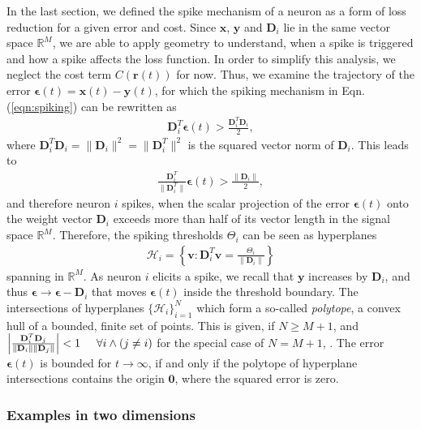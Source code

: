 \documentclass[twoside,twocolumn]{article}
\renewcommand{\b}[1]{\textbf{#1}}
\newcommand{\R}{\mathbb{R}}
\begin{document}
In the last section, we defined the spike mechanism of a neuron as a form of loss reduction for a given error and cost. Since $\b{x}$, $\b{y}$ and $\b{D}_i$ lie in the same vector space $\R^M$, we are able to apply geometry to understand, when a spike is triggered and how a spike affects the loss function. In order to simplify this analysis, we neglect the cost term $C(\b{r}(t))$ for now. Thus, we examine the trajectory of the error $\boldsymbol{\epsilon}(t) = \b{x}(t)-\b{y}(t)$, for which the spiking mechanism in Eqn. (\ref{eqn:spiking}) can be rewritten as
\begin{align}
\b{D}^T_i\boldsymbol{\epsilon}(t) > \frac{\b{D}^T_i\b{D}_i}{2},
\end{align}
where $\b{D}^T_i\b{D}_i=\| \b{D}_i \|^2=\| \b{D}^T_i \|^2$ is the squared vector norm of $\b{D}_i$. This leads to
\begin{align}
\frac{\b{D}^T_i}{\| \b{D}^T_i \|}\boldsymbol{\epsilon}(t) > \frac{\| \b{D}_i \|}{2},
\label{eqn:project}
\end{align} 
and therefore neuron $i$ spikes, when the scalar projection of the error $\boldsymbol{\epsilon}(t)$ onto the weight vector $\b{D}_i$ exceeds more than half of its vector length in the signal space $\R^M$. Therefore, the spiking thresholds $\Theta_i$ can be seen as hyperplanes 
\begin{align}
\mathcal{H}_i = \left\{ \b{v} : \b{D}_i^T\b{v} = \frac{\Theta_i}{\|\b{D}_i \|}\right\}
\end{align} 
spanning in $\R^M$. As neuron $i$ elicits a spike, we recall that $\b{y}$ increases by $\b{D}_i$, and thus $\boldsymbol{\epsilon} \rightarrow \boldsymbol{\epsilon} - \b{D}_i$ that moves $\boldsymbol{\epsilon}(t)$ inside the threshold boundary. The intersections of hyperplanes $\{\mathcal{H}_i\}_{i=1}^N$ which form a so-called \textit{polytope}, a convex hull of a bounded, finite set of points. This is given, if $N\geq M+1$, and $\left| \frac{\b{D}^T_i\b{D}_j}{\|\b{D}_i \|\|\b{D}_j \|}\right| < 1 \hspace{0.5cm} \forall i \land  (j \neq i)$ for the special case of $N=M+1$, . The error $\boldsymbol{\epsilon}(t)$ is bounded for $t\rightarrow\infty$, if and only if the polytope of hyperplane intersections contains the origin $\b{0}$, where the squared error is zero.

\subsubsection*{Examples in two dimensions}
\end{document}
